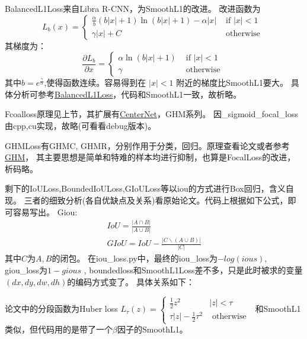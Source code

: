 \documentclass[UTF8]{ctexart}
\begin{document}
BalancedL1Loss来自Libra R-CNN，为SmoothL1的改进。
改进函数为
$$
L_{b}(x)=\left\{\begin{array}{ll}
	\frac{\alpha}{b}(b|x|+1) \ln (b|x|+1)-\alpha|x| & \text { if }|x|<1 \\
	\gamma|x|+C & \text { otherwise }
	\end{array}\right.
$$
其梯度为：
$$
\frac{\partial L_{b}}{\partial x}=\left\{\begin{array}{ll}
	\alpha \ln (b|x|+1) & \text { if }|x|<1 \\
	\gamma & \text { otherwise }
	\end{array}\right.
$$
其中$b=e^{\frac{\gamma}{\alpha}}$,使得函数连续。容易得到在 $|x|<1$ 附近的梯度比SmoothL1要大。
具体分析可参考\href{https://zhuanlan.zhihu.com/p/64541760}{BalancedL1Loss}，代码和SmoothL1一致，故析略。

Fcoalloss原理见上节，其扩展有\href{https://arxiv.org/pdf/1904.07850.pdf}{CenterNet}，GHM系列。
因\_sigmoid\_focal\_loss由cpp,cu实现，故略(可看看debug版本)。 

GHMLoss有GHMC, GHMR，分别作用于分类，回归。原理查看论文或者参考\href{https://zhuanlan.zhihu.com/p/80594704}{GHM}，
其主要思想是简单和特难的样本均进行抑制，也算是FocalLoss的改进，析码略。

剩下的IoULoss,BoundedIoULoss,GIoULoss等以iou的方式进行Box回归，含义自现。
三者的细致分析(各自优缺点及关系)看原始论文。代码上根据如下公式，即可容易写出。
Giou:
\begin{equation*}
\begin{array}{l}
	I o U=\frac{|A \cap B|}{|A \cup B|} \\
	G I o U=I o U-\frac{|C \backslash(A \cup B)|}{|C|}
	\end{array}
\end{equation*}其中$C$为$A, B$的闭包。
在iou\_loss.py中，最终的iou\_loss为$-log(ious)$, giou\_loss为$1-gious$
, boundedloss和SmoothL1Loss差不多，只是此时被求的变量$(dx,dy,dw,dh)$的编码方式变了。
具体关系如下：

论文中的分段函数为Huber loss
$
L_{\tau}(z)=\left\{\begin{array}{cc}
	\frac{1}{2} z^{2} & |z|<\tau \\
	\tau|z|-\frac{1}{2} \tau^{2} & \text { otherwise }
	\end{array}\right.
$
和SmoothL1类似，但代码用的是带了一个$\beta$因子的SmoothL1。
\end{document}
